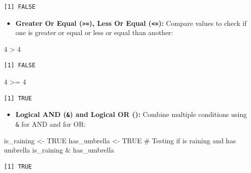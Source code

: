 \documentclass[
  letterpaper,
  DIV=11,
  numbers=noendperiod]{scrreprt}
\newenvironment{Shaded}{\begin{snugshade}}{\end{snugshade}}
\newcommand{\CommentTok}[1]{\textcolor[rgb]{0.37,0.37,0.37}{#1}}
\newcommand{\ConstantTok}[1]{\textcolor[rgb]{0.56,0.35,0.01}{#1}}
\newcommand{\DecValTok}[1]{\textcolor[rgb]{0.68,0.00,0.00}{#1}}
\newcommand{\NormalTok}[1]{\textcolor[rgb]{0.00,0.23,0.31}{#1}}
\newcommand{\OtherTok}[1]{\textcolor[rgb]{0.00,0.23,0.31}{#1}}
\newcommand{\SpecialCharTok}[1]{\textcolor[rgb]{0.37,0.37,0.37}{#1}}
\providecommand{\tightlist}{%
  \setlength{\itemsep}{0pt}\setlength{\parskip}{0pt}}\usepackage{longtable,booktabs,array}
\begin{document}
\begin{verbatim}
[1] FALSE
\end{verbatim}

\begin{itemize}
\tightlist
\item
  \textbf{Greater Or Equal (\texttt{\textgreater{}=}), Less Or Equal
  (\texttt{\textless{}=}):} Compare values to check if one is greater or
  equal or less or equal than another:
\end{itemize}

\begin{Shaded}
\begin{Highlighting}[]
\DecValTok{4} \SpecialCharTok{\textgreater{}} \DecValTok{4}
\end{Highlighting}
\end{Shaded}

\begin{verbatim}
[1] FALSE
\end{verbatim}

\begin{Shaded}
\begin{Highlighting}[]
\DecValTok{4} \SpecialCharTok{\textgreater{}=} \DecValTok{4}
\end{Highlighting}
\end{Shaded}

\begin{verbatim}
[1] TRUE
\end{verbatim}

\begin{itemize}
\tightlist
\item
  \textbf{Logical AND (\texttt{\&}) and Logical OR
  (\texttt{\textbar{}}):} Combine multiple conditions using \texttt{\&}
  for AND and \texttt{\textbar{}} for OR:
\end{itemize}

\begin{Shaded}
\begin{Highlighting}[]
\NormalTok{is\_raining }\OtherTok{\textless{}{-}} \ConstantTok{TRUE}
\NormalTok{has\_umbrella }\OtherTok{\textless{}{-}} \ConstantTok{TRUE}
\CommentTok{\# Testing if is raining and has umbrella}
\NormalTok{is\_raining }\SpecialCharTok{\&}\NormalTok{ has\_umbrella }
\end{Highlighting}
\end{Shaded}

\begin{verbatim}
[1] TRUE
\end{verbatim}
\end{document}
